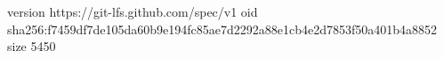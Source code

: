version https://git-lfs.github.com/spec/v1
oid sha256:f7459df7de105da60b9e194fc85ae7d2292a88e1cb4e2d7853f50a401b4a8852
size 5450
